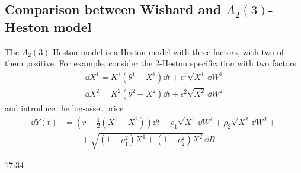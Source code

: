 \subsection{Comparison between Wishard and \texorpdfstring{$A_2(3)$}{A_2(3)}-Heston model}
The $A_2(3)$-Heston model is a Heston model with three factors, with two of them positive. For example, consider the 2-Heston specification with two factors
\begin{align*}
    \dd X^1 = K^1(\theta^1-X^1)\dd t + \epsilon^1\sqrt{X^1}\,\dd W^1 \\
    \dd X^2 = K^2(\theta^2 - X^2)\dd t + \epsilon^2\sqrt{X^2}\,\dd W^2
\end{align*}
and introduce the log-asset price
\begin{align*}
    \dd Y(t) &= \left(r-\frac{1}{2}(X^1+X^2)\right)\dd t + \rho_1\sqrt{X^1}\,\dd W^1 + \rho_2\sqrt{X^2}\,\dd W^2 + \\
    &\qquad
    +\sqrt{(1-\rho_1^2)X^1 + (1-\rho_2^2)X^2}\,\dd B
\end{align*}

17:34
